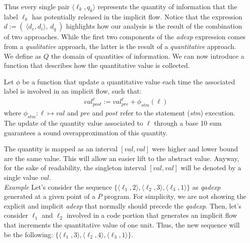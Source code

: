 \documentclass{llncs}
\newcommand{\notegian}[1]{\textbf{(NOTE: #1)}}
\begin{document}
\noindent Thus every single pair $\langle \ell_k, q_k \rangle$ represents the quantity of information that the label $\ell_k$ has potentially released in the implicit flow. Notice that the expression $d:=(\ \langle d_e, d_i \rangle ,\ d_q\ )$ highlights how our analysis is the result of the combination of two approaches. While the first two components of the \emph{adexp} expression comes from a \emph{qualitative} approach, the latter is the result of a \emph{quantitative} approach.\\

\noindent We define as $Q$ the domain of quantities of information. We can now introduce a function that describes how the quantitative value is collected.

\begin{definition}\label{quant_funct}
Let $\phi$ be a function that update a quantitative value each time the associated label is involved in an implicit flow, such that:
\begin{align*}
val_{post}^\ell := val_{pre}^\ell + \phi_{stm} (\ell)
\end{align*}
where $\phi_{stm}  : \ell \mapsto val$ and $pre$ and $post$ refer to the statement (\emph{stm}) execution. The update of the quantity value associated to $\ell$ through a base 10 sum guarantees a sound overapproximation of this quantity.
\end{definition}

\noindent The quantity is mapped as an interval $[val, val]$ were higher and lower bound are the same value. This will allow an easier lift to the abstract value. Anyway, for the sake of readability, the singleton interval $[val,val]$ will be denoted by a single value $val$.\\%

\noindent \textit{Example} Let's consider the sequence $\{\langle \ell_1, 2\rangle, \langle \ell_2, 3\rangle, \langle \ell_3, 1\rangle\}$ as \emph{qadexp} generated at a given point of a $P$ program. For simplicity, we are not showing the explicit and implicit \emph{adexp} that normally should precede the \emph{qadexp}. Then, let's consider $\ell_1$ and $\ell_2$ involved in a code portion that generates an implicit flow that increments the quantitative value of one unit. Thus, the new sequence will be the following: $\{\langle \ell_1, 3\rangle, \langle \ell_2, 4\rangle, \langle \ell_3, 1\rangle\}$. \\
\end{document}
